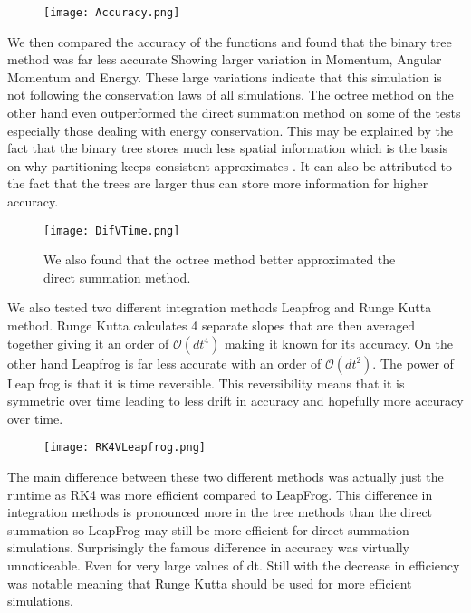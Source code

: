\documentclass[11pt]{article}
\begin{document}
\begin{figure}[h]
\begin{center}
\texttt{[image: Accuracy.png]}
\end{center}
\caption{ 
}
\label{setup}
\end{figure}
We then compared the accuracy of the functions and found that the binary tree method was far less accurate Showing larger variation in Momentum, Angular Momentum and Energy. These large variations indicate that this simulation is not following the conservation laws of all simulations. The octree method on the other hand even outperformed the direct summation method on some of the tests especially those dealing with energy conservation. This may be explained by the fact that the binary tree stores much less spatial information which is the basis on why partitioning keeps consistent approximates . It can also be attributed to the fact that the trees are larger thus can store more information for higher accuracy.

\begin{figure}[h]
\begin{center}
\texttt{[image: DifVTime.png]}
\end{center}
\caption{ We also found that the octree method better approximated the direct summation method.
}
\label{setup}
\end{figure}
\vspace{0mm} 


We also tested two different integration methods Leapfrog and Runge Kutta method. Runge Kutta calculates 4 separate slopes that are then averaged together giving it an order of $\mathcal{O}(dt^4)$ making it known for its accuracy. On the other hand Leapfrog is far less accurate with an order of $\mathcal{O}(dt^2)$. The power of Leap frog is that it is time reversible. This reversibility means that it is symmetric over time leading to less drift in accuracy and hopefully more accuracy over time. 

\begin{figure}[h]
\begin{center}
\texttt{[image: RK4VLeapfrog.png]}
\end{center}
\caption{
}
\label{setup}
\end{figure}
\vspace{100mm}
The main difference between these two different methods was actually just the runtime as RK4 was more efficient compared to LeapFrog. This difference in integration methods is pronounced more in the tree methods than the direct summation so LeapFrog may still be more efficient for direct summation simulations. Surprisingly the famous difference in accuracy was virtually unnoticeable. Even for very large values of dt. Still with the decrease in efficiency was notable meaning that Runge Kutta should be used for more efficient simulations.
\end{document}
